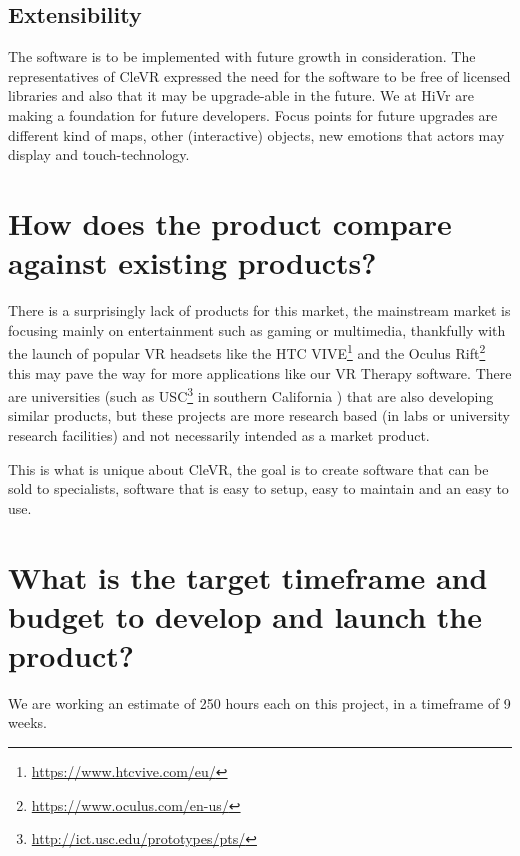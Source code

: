 \documentclass[11pt]{article}
\begin{document}
    \subsection{Extensibility}
    The software is to be implemented with future growth in consideration. The representatives of CleVR expressed the need for the software to be free of licensed libraries and also that it may be upgrade-able in the future. We at HiVr are making a foundation for future developers.
    Focus points for future upgrades are different kind of maps, other (interactive) objects, new emotions that actors may display and touch-technology.
        
\section{How does the product compare against existing products?}
There is a surprisingly lack of products for this market, the mainstream market is focusing mainly on entertainment such as gaming or multimedia, thankfully with the launch of popular VR headsets like the HTC VIVE\footnote{\url{https://www.htcvive.com/eu/}} and the Oculus Rift\footnote{\url{https://www.oculus.com/en-us/}} this may pave the way for more applications like our VR Therapy software.
\newline
There are universities (such as USC\footnote{\url{http://ict.usc.edu/prototypes/pts/}} in southern California ) that are also developing similar products, but these projects are more research based (in labs or university research facilities) and not necessarily intended as a market product.

This is what is unique about CleVR, the goal is to create software that can be sold to specialists, software that is easy to setup, easy to maintain and an easy to use. 

\section{What is the target timeframe and budget to develop and launch the product?}
	We are working an estimate of 250 hours each on this project, in a timeframe of 9 weeks.
	
\end{document}
